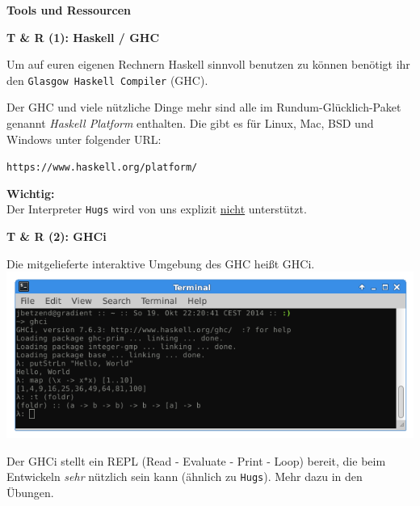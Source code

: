 \documentclass[unknownkeysallowed]{beamer}
\begin{document}
  
  \begin{frame}

    \begin{center}
    \Large\textbf{Tools und Ressourcen}
    \end{center}
  \end{frame}
  
  
  \begin{frame}
    \begin{center}
    \Large\textbf{T \& R (1): Haskell / GHC}\\ \bigskip \normalsize
    
    Um auf euren eigenen Rechnern Haskell sinnvoll benutzen zu können benötigt ihr den \texttt{Glasgow Haskell Compiler} (GHC). \bigskip
    
    Der GHC und viele nützliche Dinge mehr sind alle im Rundum-Glücklich-Paket genannt \emph{Haskell Platform} enthalten. Die gibt es für Linux, Mac, BSD und Windows unter folgender URL:
    
    \bigskip\texttt{https://www.haskell.org/platform/}\smallskip
    
    \begin{important}
    \textbf{Wichtig:}\\ Der Interpreter \texttt{Hugs} wird von uns explizit \underline{nicht} unterstützt.
    \end{important}
    \end{center}
  \end{frame}
  
  
  \begin{frame}
    \begin{center}
    \Large\textbf{T \& R (2): GHCi}\\ \bigskip \normalsize
    
    Die mitgelieferte interaktive Umgebung des GHC heißt GHCi.\\\bigskip
    \includegraphics[scale=0.4]{ghci_example.png} 
    
    \bigskip Der GHCi stellt ein REPL (Read - Evaluate - Print - Loop) bereit, die beim Entwickeln \emph{sehr} nützlich sein kann (ähnlich zu \texttt{Hugs}). Mehr dazu in den Übungen.
    \end{center}
  \end{frame}
  
\end{document}
